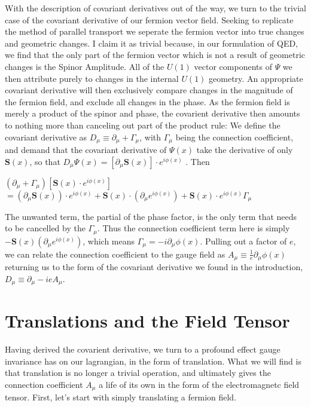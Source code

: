 \documentclass{article}
\begin{document}
        With the description of covariant derivatives out of the way, we turn to the trivial case of the covariant derivative of our fermion vector field. Seeking to replicate the method of parallel transport we seperate the fermion vector into true changes and geometric changes. I claim it as trivial because, in our formulation of QED, we find that the only part of the fermion vector which is not a result of geometric changes is the Spinor Amplitude. All of the $U(1)$ vector components of $\Psi$ we then attribute purely to changes in the internal $U(1)$ geometry. An appropriate covariant derivative will then exclusively compare changes in the magnitude of the fermion field, and exclude all changes in the phase. As the fermion field is merely a product of the spinor and phase, the covarient derivative then amounts to nothing more than canceling out part of the product rule:
        We define the covariant derivative as $ D_\mu \equiv \partial_\mu + \Gamma_\mu $, with $\Gamma_\mu$ being the connection coefficient,
        and demand that the covariant derivative of $ \Psi(x) $ take the derivative of only $\mathbf{S}(x)$, so that
        $D_\mu \Psi(x) = [ \partial_\mu \mathbf{S}(x) ] \cdot e^{i\phi(x)} $ . Then
        
        $ (\partial_\mu + \Gamma_\mu) [ \mathbf{S}(x) \cdot e^{i\phi(x)} ] $ 
        $ = (\partial_\mu \mathbf{S}(x) ) \cdot e^{i\phi(x)} +
             \mathbf{S}(x)  \cdot (\partial_\mu e^{i\phi(x)}) +
             \mathbf{S}(x)  \cdot e^{i\phi(x)} \Gamma_\mu $

        The unwanted term, the partial of the phase factor, is the only term that needs to be cancelled by the $\Gamma_\mu$. Thus the connection coefficient term here is simply $ -  \mathbf{S}(x)  (\partial_\mu e^{i\phi(x)})  $, which means 
        $\Gamma_\mu = - i \partial_\mu \phi(x) $. Pulling out a factor of $e$, we can relate the connection coefficient to the gauge field
        as $A_\mu \equiv \frac{1}{e} \partial_\mu \phi(x)$ returning us to the form of the covariant derivative we found in the introduction,
        $ D_\mu \equiv \partial_\mu - i e A_\mu $.


\section{Translations and the Field Tensor}
        Having derived the covarient derivative, we turn to a profound effect gauge invariance has on our lagrangian, in the form of translation. What we will find is that translation is no longer a trivial operation, and ultimately gives the connection coefficient $A_\mu$ a life of its own in the form of the electromagnetc field tensor. First, let's start with simply translating a fermion field.
        
\end{document}

